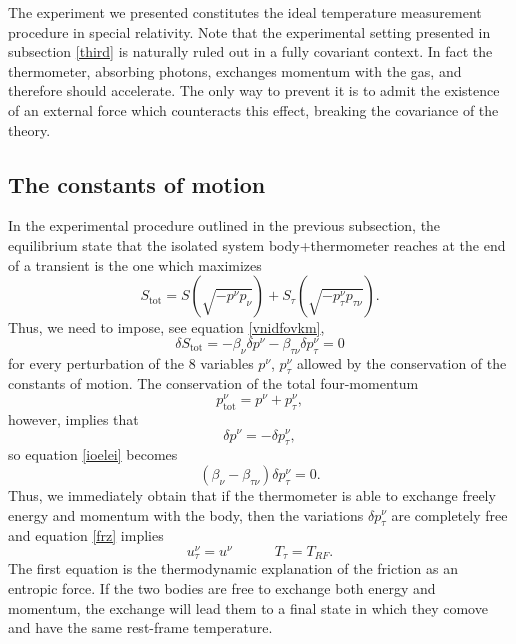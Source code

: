 \documentclass[twocolumn,usenatbib]{mnras2}
\newcommand{\spc}{\quad \quad \quad}
\begin{document}
The experiment we presented constitutes the ideal temperature measurement procedure in special relativity. Note that the experimental setting presented in subsection \ref{third} is naturally ruled out in a fully covariant context. In fact the thermometer, absorbing photons, exchanges momentum with the gas, and therefore should accelerate. The only way to prevent it is to admit the existence of an external force which counteracts this effect, breaking the covariance of the theory.


\subsection{The constants of motion}\label{comot}

In the experimental procedure outlined in the previous subsection, the equilibrium state that the isolated system body+thermometer reaches at the end of a transient is the one which maximizes
\begin{equation}
S_{\text{tot}}= S(\sqrt{-p^\nu p_\nu}) + S_\tau (\sqrt{-p_\tau^\nu p_{\tau \nu}}).
\end{equation}
Thus, we need to impose, see equation \eqref{vnidfovkm},
\begin{equation}\label{ioelei}
\delta S_{\text{tot}} = -\beta_\nu \delta p^\nu -\beta_{\tau\nu} \delta p_\tau^\nu =0 
\end{equation}
for every perturbation of the 8 variables $p^\nu$, $p^\nu_\tau$ allowed by the conservation of the constants of motion. The conservation of the total four-momentum 
\begin{equation}
p_{\text{tot}}^\nu = p^\nu + p^\nu_{\tau},
\end{equation}
however, implies that 
\begin{equation}
\delta p^\nu = -\delta p_\tau^\nu,
\end{equation}
so equation \eqref{ioelei} becomes
\begin{equation}\label{frz}
(\beta_\nu - \beta_{\tau \nu}) \delta p^\nu_\tau =0.
\end{equation}
Thus, we immediately obtain that if the thermometer is able to exchange freely energy and momentum with the body, then the variations $\delta p^\nu_\tau$ are completely free and equation \eqref{frz} implies
\begin{equation}\label{justyou}
u^\nu_\tau = u^\nu  \spc  T_{\tau} = T_{RF} .
\end{equation}
The first equation is the thermodynamic explanation of the friction as an entropic force. If the two bodies are free to exchange both energy and momentum, the exchange will lead them to a final state in which they comove and have the same rest-frame temperature.
\end{document}
